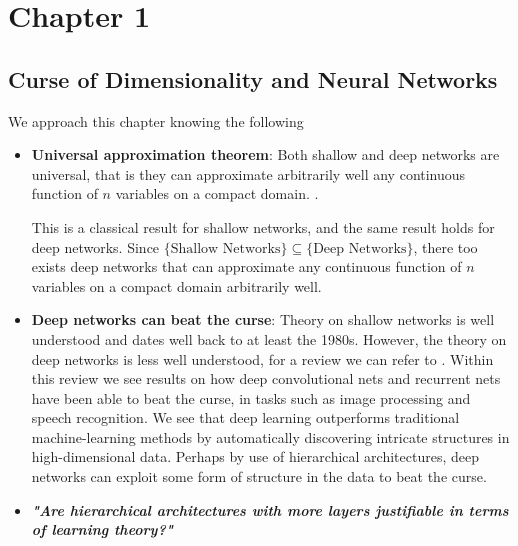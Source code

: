 \documentclass[11pt,a4paper]{article}
\theoremstyle{plain}
\theoremstyle{definition}
\theoremstyle{remark}
\begin{document}

\chapter{Chapter 1}

\section{Curse of Dimensionality and Neural Networks}

We approach this chapter knowing the following
\begin{itemize}
    \item \textbf{Universal approximation theorem}: Both shallow and deep networks are universal, that is they can approximate arbitrarily well any continuous function of \(n\)  variables on a compact domain. \cite{UniversalApprox}.
    
    This is a classical result for shallow networks, and the same result holds for deep networks. Since \(\{\text{Shallow Networks}\} \subseteq \{\text{Deep Networks}\}\), there too exists deep networks that can approximate any continuous function of \(n\) variables on a compact domain arbitrarily well.

    \item \textbf{Deep networks can beat the curse}: Theory on shallow networks is well understood and dates well back to at least the 1980s. However, the theory on deep networks is less well understood, for a review we can refer to \cite{DeepReviewNature}. Within this review we see results on how deep convolutional nets and recurrent nets have been able to beat the curse, in tasks such as image processing and speech recognition. We see that deep learning outperforms traditional machine-learning methods by automatically discovering intricate structures in high-dimensional data. Perhaps by use of hierarchical architectures, deep networks can exploit some form of structure in the data to beat the curse.
    
    \item \textbf{\textit{"Are hierarchical architectures with more layers justifiable in terms of learning theory?"}} \cite{poggioHierarchy}
    

\end{itemize}
\end{document}
